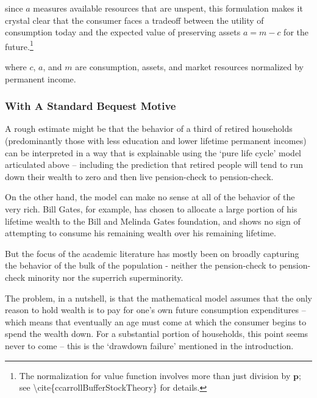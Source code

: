 \documentclass{article}
\newcommand{\pLvl}{\mathbf{p}}
\newcommand{\cNrm}{c}
\newcommand{\RNrm}{\mathcal{R}}
\newcommand{\aNrm}{a}
\newcommand{\mNrm}{m}
\begin{document}
\bigskipand since $\aNrm$ measures available resources that are unspent, this formulation makes it crystal clear that the consumer faces a tradeoff between the utility of consumption today and the expected value of preserving assets $\aNrm=\mNrm -\cNrm$ for the future.\footnote{The normalization for value function involves more than just division by $\pLvl$; see {\textbackslash}cite\{ccarrollBufferStockTheory\} for details.}

where $\cNrm$, $\aNrm$, and $\mNrm$ are consumption, assets, and market resources normalized by permanent income.


\subsubsection{With A Standard Bequest Motive}

A rough estimate might be that the behavior of a third of retired households (predominantly those with less education and lower lifetime permanent incomes) can be interpreted in a way that is explainable using the `pure life cycle' model articulated above -- including the prediction that retired people will tend to run down their wealth to zero and then live pension-check to pension-check.

On the other hand, the model can make no sense at all of the behavior of the very rich. Bill Gates, for example, has chosen to allocate a large portion of his lifetime wealth to the Bill and Melinda Gates foundation, and shows no sign of attempting to consume his remaining wealth over his remaining lifetime.


But the focus of the academic literature has mostly been on broadly capturing the behavior of the bulk of the population - neither the pension-check to pension-check minority nor the superrich superminority.



The problem, in a nutshell, is that the mathematical model assumes that the only reason to hold wealth is to pay for one's own future consumption expenditures -- which means that eventually an age must come at which the consumer begins to spend the wealth down. For a substantial portion of households, this point seems never to come -- this is the `drawdown failure' mentioned in the introduction.
\end{document}
